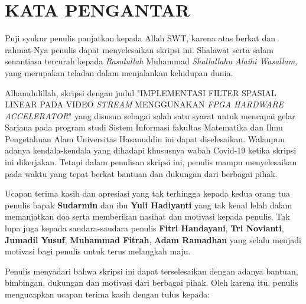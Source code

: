 ﻿\chapter*{KATA PENGANTAR}

Puji syukur penulis panjatkan kepada Allah SWT, karena atas berkat dan rahmat-Nya penulis dapat menyelesaikan skripsi ini. Shalawat serta salam senantiasa tercurah kepada \textit{Rasulullah} Muhammad \textit{Shallallahu Alaihi Wasallam,} yang merupakan teladan dalam menjalankan kehidupan dunia.

Alhamdulillah, skripsi dengan judul "IMPLEMENTASI FILTER SPASIAL LINEAR PADA VIDEO \textit{STREAM} MENGGUNAKAN \textit{FPGA HARDWARE ACCELERATOR}" yang disusun sebagai salah satu syarat untuk mencapai gelar Sarjana pada program studi Sistem Informasi fakultas Matematika dan Ilmu Pengetahuan Alam Universitas Hasanuddin ini dapat diselesaikan. Walaupun adanya kendala-kendala yang dihadapi khususnya wabah Covid-19 ketika skripsi ini dikerjakan. Tetapi dalam penulisan skripsi ini, penulis mampu menyelesaikan pada waktu yang tepat berkat bantuan dan dukungan dari berbagai pihak. 

Ucapan terima kasih dan apresiasi yang tak terhingga kepada kedua orang tua penulis bapak \textbf{Sudarmin} dan ibu \textbf{Yuli Hadiyanti} yang tak kenal lelah dalam memanjatkan doa serta memberikan nasihat dan motivasi kepada penulis. Tak lupa juga kepada saudara-saudara penulis \textbf{Fitri Handayani}, \textbf{Tri Novianti}, \textbf{Jumadil Yusuf}, \textbf{Muhammad Fitrah}, \textbf{Adam Ramadhan} yang selalu menjadi motivasi bagi penulis untuk terus melangkah maju.

Penulis menyadari bahwa skripsi ini dapat terselesaikan dengan adanya bantuan, bimbingan, dukungan dan motivasi dari berbagai pihak. Oleh karena itu, penulis mengucapkan ucapan terima kasih dengan tulus kepada:

